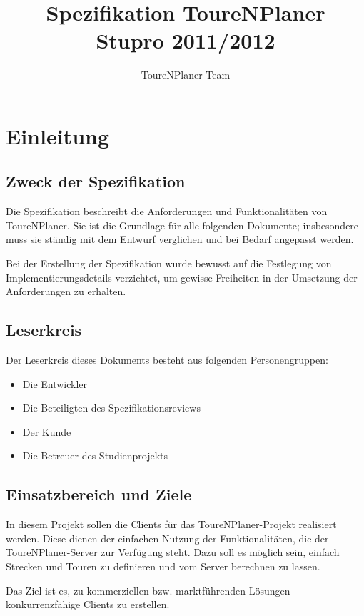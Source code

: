 \documentclass[a4paper,10pt,titlepage]{article}
\author{ToureNPlaner Team}
\title{Spezifikation ToureNPlaner\\ Stupro 2011/2012}
\begin{document}
\maketitle
{}
\setcounter{page}{1}
\tableofcontents
\clearpage
{}
\setcounter{page}{1}

\section{Einleitung}
\subsection{Zweck der Spezifikation}
Die Spezifikation beschreibt die Anforderungen und Funktionalitäten von ToureNPlaner. Sie ist die Grundlage für alle folgenden Dokumente; insbesondere muss sie ständig mit dem Entwurf verglichen und bei Bedarf angepasst werden.

Bei der Erstellung der Spezifikation wurde bewusst auf die Festlegung von Implementierungsdetails verzichtet, um gewisse Freiheiten in der Umsetzung der Anforderungen zu erhalten.

\subsection{Leserkreis}
Der Leserkreis dieses Dokuments besteht aus folgenden Personengruppen:
\begin{itemize}
\item Die Entwickler
\item Die Beteiligten des Spezifikationsreviews
\item Der Kunde
\item Die Betreuer des Studienprojekts
\end{itemize}

\subsection{Einsatzbereich und Ziele}

In diesem Projekt sollen die Clients für das ToureNPlaner-Projekt realisiert werden.
Diese dienen der einfachen Nutzung der Funktionalitäten, die der ToureNPlaner-Server zur Verfügung steht.
Dazu soll es möglich sein, einfach Strecken und Touren zu definieren und vom Server berechnen zu lassen.

\noindent Das Ziel ist es, zu kommerziellen bzw. marktführenden Lösungen konkurrenzfähige Clients zu erstellen.
\end{document}
